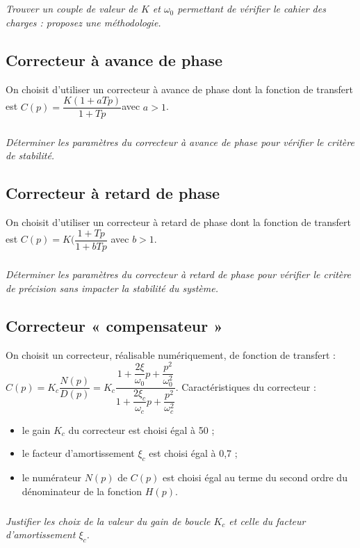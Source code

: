 \documentclass[10pt,fleqn]{article} %
\begin{document}
\begin{multicols}{2}
\subparagraph{}
\textit{Trouver un couple de valeur de $K$ et $\omega_0$ permettant de vérifier le cahier des charges : proposez une méthodologie.}
\ifprof
\begin{corrige}
\end{corrige}
\else
\fi

\subsection*{Correcteur à avance de phase}
On choisit d’utiliser un correcteur à avance de phase dont la fonction de transfert est 
$C(p)=\dfrac{K (1+aTp)}{1+Tp}$avec $a>1$.
\subparagraph{}
\textit{Déterminer les paramètres du correcteur à avance de phase pour vérifier le critère de stabilité.}
\ifprof
\begin{corrige}
\end{corrige}
\else
\fi

\subsection*{Correcteur à retard de phase}
On choisit d’utiliser un correcteur à retard de phase dont la fonction de transfert est $C(p)=K (\dfrac{1+Tp}{1+bTp}$ avec $b>1$.
\subparagraph{}
\textit{Déterminer les paramètres du correcteur à retard de phase pour vérifier le critère de précision sans impacter la stabilité du système.}
\ifprof
\begin{corrige}
\end{corrige}
\else
\fi


\subsection*{Correcteur « compensateur »}
On choisit un correcteur, réalisable numériquement, de fonction de transfert :	$C(p)=K_c\dfrac{ N(p)}{D(p)}=K_c\dfrac{1+\dfrac{2\xi}{\omega_0} p+\dfrac{p^2}{\omega_0^2}}{1+\dfrac{2\xi_c}{\omega_c}  p+\dfrac{p^2}{\omega_c^2 }}$.
Caractéristiques du correcteur :	
\begin{itemize}
\item le gain $K_c$ du correcteur est choisi égal à 50 ;
\item le facteur d’amortissement $\xi_c$ est choisi égal à 0,7 ;
\item le numérateur $N(p)$ de $C(p)$ est choisi égal au terme du second ordre du dénominateur de la fonction $H(p)$.
\end{itemize}
\subparagraph{}
\textit{Justifier les choix de la valeur du gain de boucle $K_c$ et celle du facteur d’amortissement $\xi_c$.}
\ifprof
\begin{corrige}
\end{corrige}
\else
\fi


\end{multicols}
\end{document}
